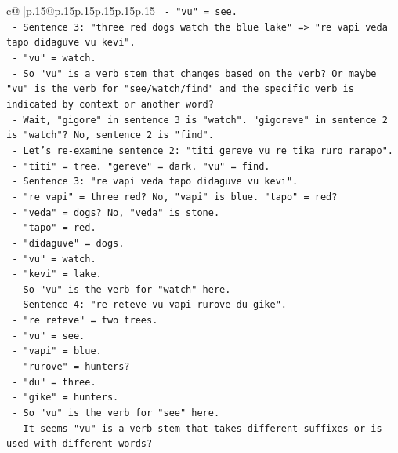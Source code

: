 \documentclass{article}
\begin{document}
{\begin{supertabular}{c@{$\;$}|p{.15\linewidth}@{}p{.15\linewidth}p{.15\linewidth}p{.15\linewidth}p{.15\linewidth}p{.15\linewidth}}
{{{\texttt{            {-} "vu" = see.} \\
\texttt{          {-} Sentence 3: "three red dogs watch the blue lake" => "re vapi veda tapo didaguve vu kevi".} \\
\texttt{            {-} "vu" = watch.} \\
\texttt{          {-} So "vu" is a verb stem that changes based on the verb? Or maybe "vu" is the verb for "see/watch/find" and the specific verb is indicated by context or another word?} \\
\texttt{          {-} Wait, "gigore" in sentence 3 is "watch". "gigoreve" in sentence 2 is "watch"? No, sentence 2 is "find".} \\
\texttt{          {-} Let's re{-}examine sentence 2: "titi gereve vu re tika ruro rarapo".} \\
\texttt{            {-} "titi" = tree. "gereve" = dark. "vu" = find.} \\
\texttt{          {-} Sentence 3: "re vapi veda tapo didaguve vu kevi".} \\
\texttt{            {-} "re vapi" = three red? No, "vapi" is blue. "tapo" = red?} \\
\texttt{            {-} "veda" = dogs? No, "veda" is stone.} \\
\texttt{            {-} "tapo" = red.} \\
\texttt{            {-} "didaguve" = dogs.} \\
\texttt{            {-} "vu" = watch.} \\
\texttt{            {-} "kevi" = lake.} \\
\texttt{            {-} So "vu" is the verb for "watch" here.} \\
\texttt{          {-} Sentence 4: "re reteve vu vapi rurove du gike".} \\
\texttt{            {-} "re reteve" = two trees.} \\
\texttt{            {-} "vu" = see.} \\
\texttt{            {-} "vapi" = blue.} \\
\texttt{            {-} "rurove" = hunters?} \\
\texttt{            {-} "du" = three.} \\
\texttt{            {-} "gike" = hunters.} \\
\texttt{            {-} So "vu" is the verb for "see" here.} \\
\texttt{          {-} It seems "vu" is a verb stem that takes different suffixes or is used with different words?} \\
}}}
\end{supertabular}}
\end{document}
